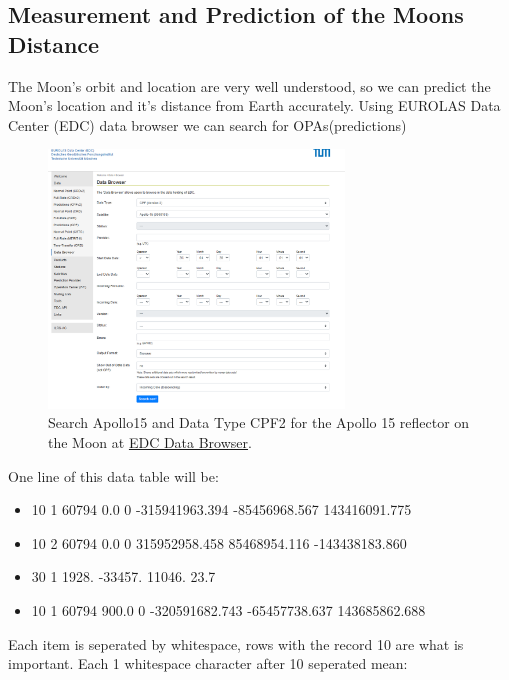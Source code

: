 \documentclass[12pt,oneside,a4paper,english]{article}
\begin{document}
\subsection{Measurement and Prediction of the Moons Distance}
The Moon's orbit and location are very well understood, so we can predict the Moon's location and it's distance from Earth accurately. Using EUROLAS Data Center (EDC) data browser we can search for OPAs(predictions)
\begin{figure}[H]
    \centering
    \includegraphics[width=0.7\textwidth]{EDC1.png}
    \caption{Search Apollo15 and Data Type CPF2 for the Apollo 15 reflector on the Moon at \href{https://edc.dgfi.tum.de/en/data/browser/}{EDC Data Browser}.}
\end{figure}
One line of this data table will be:
\begin{itemize}
    \item[] 10 1 60794       0.0 0      -315941963.394       -85456968.567       143416091.775 
    \item[] 10 2 60794       0.0 0       315952958.458        85468954.116      -143438183.860 
    \item[] 30 1        1928.     -33457.      11046.    23.7 
    \item[] 10 1 60794     900.0 0      -320591682.743       -65457738.637       143685862.688
\end{itemize}
Each item is seperated by whitespace, rows with the record 10 are what is important. Each 1 whitespace character after 10 seperated mean:
\end{document}
